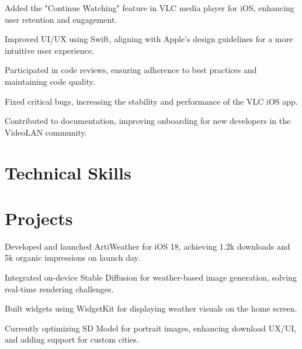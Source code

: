 \documentclass{fonts}
\begin{document}
\textbf{\href{https://summerofcode.withgoogle.com/projects/6623823417311232}{}} 
\begin{tightemize}
    \item Added the "Continue Watching" feature in VLC media player for iOS, enhancing user retention and engagement.
    \item Improved UI/UX using Swift, aligning with Apple's design guidelines for a more intuitive user experience.
    \item Participated in code reviews, ensuring adherence to best practices and maintaining code quality.
    \item Fixed critical bugs, increasing the stability and performance of the VLC iOS app.
    \item Contributed to documentation, improving onboarding for new developers in the VideoLAN community.
\end{tightemize}


\section{Technical Skills }


\section{Projects}

\textbf{\href{https://apps.apple.com/app/artiweather/id6446815662}{}} 
\begin{tightemize}
    \item Developed and launched ArtiWeather for iOS 18, achieving 1.2k downloads and 5k organic impressions on launch day.
    \item Integrated on-device Stable Diffusion for weather-based image generation, solving real-time rendering challenges.
    \item Built widgets using WidgetKit for displaying weather visuals on the home screen.
    \item Currently optimizing SD Model for portrait images, enhancing download UX/UI, and adding support for custom cities.
\end{tightemize}
\sectionsep
\end{document}
